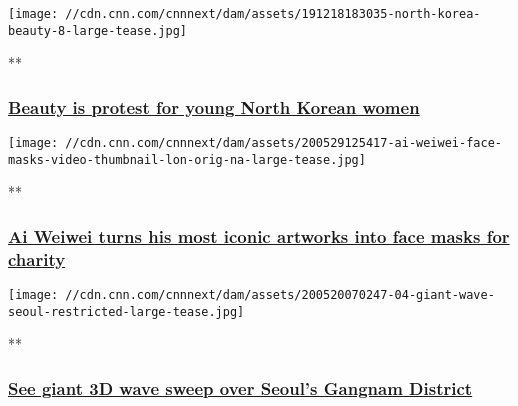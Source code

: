 \href{/videos/beauty/2020/02/12/north-korea-womens-beauty-freedom.cnn/video/playlists/cnn-style/}{}

\texttt{[image: //cdn.cnn.com/cnnnext/dam/assets/191218183035-north-korea-beauty-8-large-tease.jpg]}

**

\hypertarget{beauty-is-protest-for-young-north-korean-women}{%
\subsubsection{\texorpdfstring{\href{/videos/beauty/2020/02/12/north-korea-womens-beauty-freedom.cnn/video/playlists/cnn-style/}{Beauty
is protest for young North Korean
women}}{Beauty is protest for young North Korean women}}\label{beauty-is-protest-for-young-north-korean-women}}

\href{/videos/arts/2020/05/28/ai-weiwei-charity-face-masks-lon-orig-na.cnn/video/playlists/cnn-style/}{}

\texttt{[image: //cdn.cnn.com/cnnnext/dam/assets/200529125417-ai-weiwei-face-masks-video-thumbnail-lon-orig-na-large-tease.jpg]}

**

\hypertarget{ai-weiwei-turns-his-most-iconic-artworks-into-face-masks-for-charity}{%
\subsubsection{\texorpdfstring{\href{/videos/arts/2020/05/28/ai-weiwei-charity-face-masks-lon-orig-na.cnn/video/playlists/cnn-style/}{Ai
Weiwei turns his most iconic artworks into face masks for
charity}}{Ai Weiwei turns his most iconic artworks into face masks for charity}}\label{ai-weiwei-turns-his-most-iconic-artworks-into-face-masks-for-charity}}

\href{/videos/design/2020/05/21/3d-wave-installation-seoul-south-korea-lon-orig-na.cnn/video/playlists/cnn-style/}{}

\texttt{[image: //cdn.cnn.com/cnnnext/dam/assets/200520070247-04-giant-wave-seoul-restricted-large-tease.jpg]}

**

\hypertarget{see-giant-3d-wave-sweep-over-seouls-gangnam-district}{%
\subsubsection{\texorpdfstring{\href{/videos/design/2020/05/21/3d-wave-installation-seoul-south-korea-lon-orig-na.cnn/video/playlists/cnn-style/}{See
giant 3D wave sweep over Seoul's Gangnam
District}}{See giant 3D wave sweep over Seoul's Gangnam District}}\label{see-giant-3d-wave-sweep-over-seouls-gangnam-district}}

